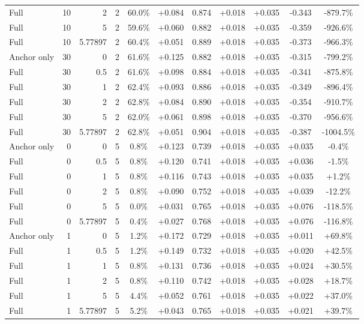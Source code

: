 \begin{table}[htbp]
\begin{tabular}{lrrrccccccc}
Full & 10 & 2 & 2 & 60.0\% & +0.084 & 0.874 & +0.018 & +0.035 & -0.343 & -879.7\% \\
Full & 10 & 5 & 2 & 59.6\% & +0.060 & 0.882 & +0.018 & +0.035 & -0.359 & -926.6\% \\
Full & 10 & 5.77897 & 2 & 60.4\% & +0.051 & 0.889 & +0.018 & +0.035 & -0.373 & -966.3\% \\
Anchor only & 30 & 0 & 2 & 61.6\% & +0.125 & 0.882 & +0.018 & +0.035 & -0.315 & -799.2\% \\
Full & 30 & 0.5 & 2 & 61.6\% & +0.098 & 0.884 & +0.018 & +0.035 & -0.341 & -875.8\% \\
Full & 30 & 1 & 2 & 62.4\% & +0.093 & 0.886 & +0.018 & +0.035 & -0.349 & -896.4\% \\
Full & 30 & 2 & 2 & 62.8\% & +0.084 & 0.890 & +0.018 & +0.035 & -0.354 & -910.7\% \\
Full & 30 & 5 & 2 & 62.0\% & +0.061 & 0.898 & +0.018 & +0.035 & -0.370 & -956.6\% \\
Full & 30 & 5.77897 & 2 & 62.8\% & +0.051 & 0.904 & +0.018 & +0.035 & -0.387 & -1004.5\% \\
Anchor only & 0 & 0 & 5 & 0.8\% & +0.123 & 0.739 & +0.018 & +0.035 & +0.035 & -0.4\% \\
Full & 0 & 0.5 & 5 & 0.8\% & +0.120 & 0.741 & +0.018 & +0.035 & +0.036 & -1.5\% \\
Full & 0 & 1 & 5 & 0.8\% & +0.116 & 0.743 & +0.018 & +0.035 & +0.035 & +1.2\% \\
Full & 0 & 2 & 5 & 0.8\% & +0.090 & 0.752 & +0.018 & +0.035 & +0.039 & -12.2\% \\
Full & 0 & 5 & 5 & 0.0\% & +0.031 & 0.765 & +0.018 & +0.035 & +0.076 & -118.5\% \\
Full & 0 & 5.77897 & 5 & 0.4\% & +0.027 & 0.768 & +0.018 & +0.035 & +0.076 & -116.8\% \\
Anchor only & 1 & 0 & 5 & 1.2\% & +0.172 & 0.729 & +0.018 & +0.035 & +0.011 & +69.8\% \\
Full & 1 & 0.5 & 5 & 1.2\% & +0.149 & 0.732 & +0.018 & +0.035 & +0.020 & +42.5\% \\
Full & 1 & 1 & 5 & 0.8\% & +0.131 & 0.736 & +0.018 & +0.035 & +0.024 & +30.5\% \\
Full & 1 & 2 & 5 & 0.8\% & +0.110 & 0.742 & +0.018 & +0.035 & +0.028 & +18.7\% \\
Full & 1 & 5 & 5 & 4.4\% & +0.052 & 0.761 & +0.018 & +0.035 & +0.022 & +37.0\% \\
Full & 1 & 5.77897 & 5 & 5.2\% & +0.043 & 0.765 & +0.018 & +0.035 & +0.021 & +39.7\% \\

\end{tabular}
\end{table}
